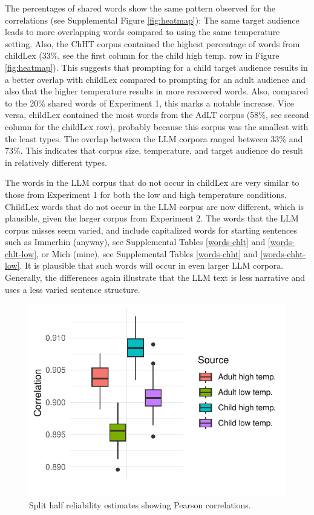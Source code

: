 \documentclass[doc, a4paper]{apa7}
\begin{document}
The percentages of shared words show the same pattern observed for the correlations (see Supplemental Figure \ref{fig:heatmap}): The same target audience leads to more overlapping words compared to using the same temperature setting. Also, the ChHT corpus contained the highest percentage of words from childLex (33\%, see the first column for the child high temp. row in Figure \ref{fig:heatmap}). This suggests that prompting for a child target audience results in a better overlap with childLex compared to prompting for an adult audience and also that the higher temperature results in more recovered words. Also, compared to the 20\% shared words of Experiment 1, this marks a notable increase. Vice versa, childLex contained the most words from the AdLT corpus (58\%, see second column for the childLex row), probably because this corpus was the smallest with the least types. The overlap between the LLM corpora ranged between 33\% and 73\%. This indicates that corpus size, temperature, and target audience do result in relatively different types.  

The words in the LLM corpus that do not occur in childLex are very similar to those from Experiment 1 for both the low and high temperature conditions. ChildLex words that do not occur in the LLM corpus are now different, which is plausible, given the larger corpus from Experiment 2. The words that the LLM corpus misses seem varied, and include capitalized words for starting sentences such as Immerhin (anyway), see Supplemental Tables \ref{words-chlt} and \ref{words-chlt-low}, or Mich (mine), see Supplemental Tables \ref{words-chht} and \ref{words-chht-low}. It is plausible that such words will occur in even larger LLM corpora. Generally, the differences again illustrate that the LLM text is less narrative and uses a less varied sentence structure. 


\begin{figure}[!htbp]
  \centerline{
    \includegraphics[width=.5\textwidth]{figures/boxplot-split-pearson.pdf}}
    \caption{Split half reliability estimates showing Pearson correlations.}
    \label{fig:reliablity}
\end{figure}
\end{document}
